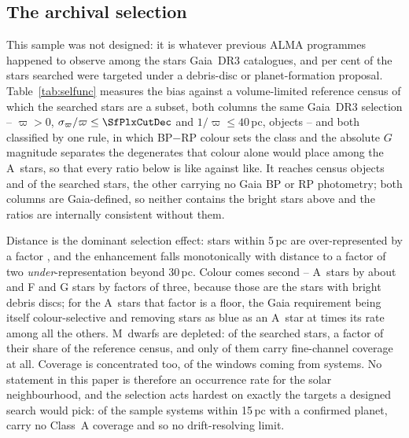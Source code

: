 \subsection{The archival selection}
\label{sec:bias}

This sample was not designed: it is whatever previous ALMA programmes happened
to observe among the stars Gaia~DR3 catalogues, and \PctDiscProposal{} per cent
of the stars searched were targeted under a debris-disc or planet-formation
proposal. Table~\ref{tab:selfunc} measures the bias against a volume-limited
reference census of which the searched stars are a subset, both columns the
same Gaia~DR3 selection -- $\varpi>0$, $\sigma_\varpi/\varpi\le\SfPlxCutDec$
and $1/\varpi\le40$\,pc, \SfCensusN{} objects -- and both classified by one
rule, in which BP$-$RP colour sets the class and the absolute $G$ magnitude
separates the degenerates that colour alone would place among the A~stars, so
that every ratio below is like against like. It reaches \SfCensusNCol{} census
objects and \SfNClassified{} of the \SfNStar{} searched stars, the other
\SfNNoColour{} carrying no Gaia BP or RP photometry; both columns are
Gaia-defined, so neither contains the bright stars above and the ratios are
internally consistent without them.

Distance is the dominant selection effect: stars within 5\,pc are
over-represented by a factor \SfTopRatio, and the enhancement falls
monotonically with distance to a factor of two \emph{under}-representation
beyond 30\,pc. Colour comes second -- A~stars by about \SfARatio{} and F and G
stars by factors of three, because those are the stars with bright debris
discs; for the A~stars that factor is a floor, the Gaia requirement being
itself colour-selective and removing stars as blue as an A~star at
\BsEarlyRatio{} times its rate among all the others. M~dwarfs are depleted:
\SfMSearched{} of the \SfNStar{} searched stars, a factor \SfMRatio{} of their
share of the reference census, and only \SfMClassAStars{} of them carry
fine-channel coverage at all. Coverage is concentrated too, \ConcThreeWin{} of
the \NWindows{} windows coming from \ConcThreeSys{} systems. No statement in
this paper is therefore an occurrence rate for the solar neighbourhood, and the
selection acts hardest on exactly the targets a designed search would pick: of
the \CsIntNRow{} sample systems within 15\,pc with a confirmed planet,
\CsIntNoClassA{} carry no Class~A coverage and so no drift-resolving limit.



